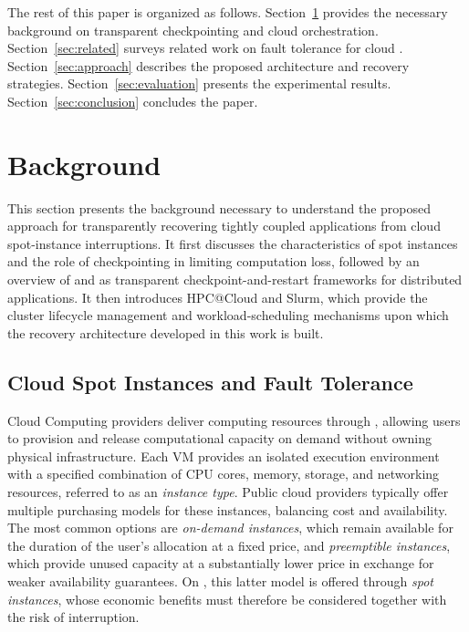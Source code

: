 \documentclass[conference]{IEEEtran}
\begin{document}
The rest of this paper is organized as follows.
Section~\ref{sec:background} provides the necessary background on transparent
checkpointing and cloud \HPC orchestration.
Section~\ref{sec:related} surveys related work on fault tolerance for cloud \HPC.
Section~\ref{sec:approach} describes the proposed architecture and recovery strategies.
Section~\ref{sec:evaluation} presents the experimental results.
Section~\ref{sec:conclusion} concludes the paper.


\section{Background}
\label{sec:background}

This section presents the background necessary to understand the proposed approach for
transparently recovering tightly coupled \MPI applications from cloud spot-instance
interruptions. It first discusses the characteristics of spot instances and the role
of checkpointing in limiting computation loss, followed by an overview of \DMTCP and
\MANA as transparent checkpoint-and-restart frameworks for distributed applications.
It then introduces HPC@Cloud and Slurm, which provide the cluster lifecycle management
and workload-scheduling mechanisms upon which the recovery architecture developed in
this work is built.

\subsection{Cloud Spot Instances and Fault Tolerance}
\label{sec:spot-ft}

Cloud Computing providers deliver computing resources through \VMs, allowing users to provision and release computational capacity on demand without owning physical infrastructure. Each VM provides an isolated execution environment with a specified combination of CPU cores, memory, storage, and networking resources, referred to as an \emph{instance type}. Public cloud providers typically offer multiple purchasing models for these instances, balancing cost and availability. The most common options are \emph{on-demand instances}, which remain available for the duration of the user's allocation at a fixed price, and \emph{preemptible instances}, which provide unused capacity at a substantially lower price in exchange for weaker availability guarantees. On \AWS, this latter model is offered through \emph{spot instances}, whose economic benefits must therefore be considered together with the risk of interruption.
\end{document}
